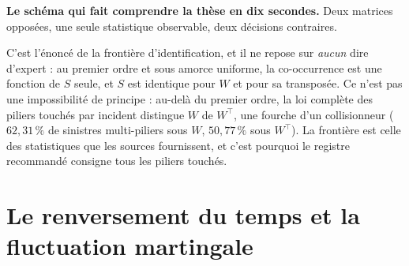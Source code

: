 \documentclass[11pt,a4paper]{article}
\providecommand{\Prob}{\mathbb{P}}
\begin{document}
\medskip
\noindent\textbf{Le schéma qui fait comprendre la thèse en dix secondes.} Deux matrices
opposées, une seule statistique observable, deux décisions contraires.

\begin{center}
\end{center}

\noindent C'est l'énoncé de la frontière d'identification, et il ne repose sur \emph{aucun} dire
d'expert : au premier ordre et sous amorce uniforme, la co-occurrence est une fonction de $S$ seule,
et $S$ est identique pour $W$ et pour sa transposée. \textcolor{accent}{Ce n'est pas une
impossibilité de principe} : au-delà du premier ordre, la loi complète des piliers touchés par
incident distingue $W$ de $W^\top$, une fourche d'un collisionneur ($62{,}31\,\%$ de sinistres
multi-piliers sous $W$, $50{,}77\,\%$ sous $W^\top$). La frontière est celle des statistiques que
les sources fournissent, et c'est pourquoi le registre recommandé consigne tous les piliers
touchés.

\section{Le renversement du temps et la fluctuation martingale}
\end{document}
